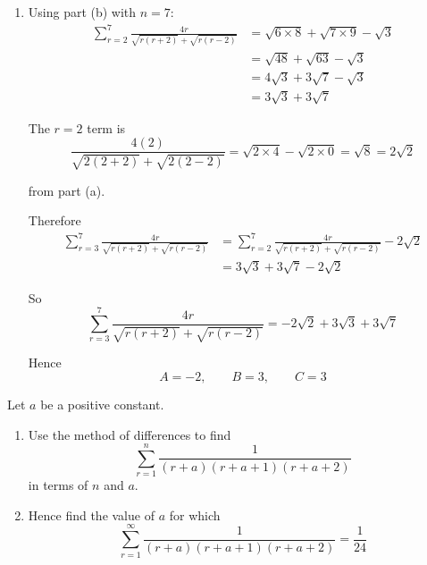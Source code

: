 \documentclass[leqno]{article}
\begin{document}
\begin{enumerate}[
  label=\textbf{\arabic*.},
  leftmargin=*,
  topsep=0pt,
  partopsep=0pt,
  parsep=0pt
]
\begin{djsSolution}
\begin{enumerate}[label=\textbf{(\alph*)}]
  Now
  \[
  u_{n-1}=\sqrt{(n-1)(n+1)},\quad u_n=\sqrt{n(n+2)},\quad u_0=\sqrt{0\times 2}=0,\quad u_1=\sqrt{1\times 3}=\sqrt3
  \]

  Hence
  \[
  \sum_{r=2}^{n}\frac{4r}{\sqrt{r(r+2)}+\sqrt{r(r-2)}}
  =\sqrt{(n-1)(n+1)}+\sqrt{n(n+2)}-\sqrt3
  \]

  \item Using part (b) with \(n=7\):
  \begin{align*}
  \sum_{r=2}^{7}\frac{4r}{\sqrt{r(r+2)}+\sqrt{r(r-2)}}
  &=\sqrt{6\times 8}+\sqrt{7\times 9}-\sqrt3\\
  &=\sqrt{48}+\sqrt{63}-\sqrt3\\
  &=4\sqrt3+3\sqrt7-\sqrt3\\
  &=3\sqrt3+3\sqrt7
  \end{align*}

  The $r=2$ term is
  \[
  \frac{4(2)}{\sqrt{2(2+2)}+\sqrt{2(2-2)}}=\sqrt{2\times 4}-\sqrt{2\times 0}=\sqrt8=2\sqrt2
  \]

  from part (a).

  Therefore
  \begin{align*}
  \sum_{r=3}^{7}\frac{4r}{\sqrt{r(r+2)}+\sqrt{r(r-2)}}
  &=\sum_{r=2}^{7}\frac{4r}{\sqrt{r(r+2)}+\sqrt{r(r-2)}}-2\sqrt2\\
  &=3\sqrt3+3\sqrt7-2\sqrt2
  \end{align*}

  So
  \[
  \sum_{r=3}^{7}\frac{4r}{\sqrt{r(r+2)}+\sqrt{r(r-2)}}=-2\sqrt2+3\sqrt3+3\sqrt7
  \]

  Hence
  \[
  A=-2,\qquad B=3,\qquad C=3
  \]
\end{enumerate}
\end{djsSolution}


\newpage

\questionitem

Let $a$ be a positive constant. \\
\begin{enumerate}[label=\textbf{(\alph*)}]
  \item Use the method of differences to find
  \[
  \sum_{r=1}^{n} \frac{1}{(r+a)(r+a+1)(r+a+2)}
  \]
  in terms of $n$ and $a$.  \\
  \item Hence find the value of $a$ for which
  \[
  \sum_{r=1}^{\infty} \frac{1}{(r+a)(r+a+1)(r+a+2)} = \frac{1}{24}
  \]
\end{enumerate}


\end{enumerate}
\end{document}
